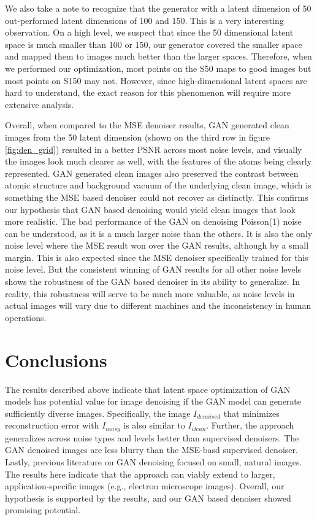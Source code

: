 \documentclass{article}
\begin{document}
We also take a note to recognize that the generator with a latent dimension of 50 out-performed latent dimensions of 100 and 150. This is a very interesting observation. On a high level, we suspect that since the 50 dimensional latent space is much smaller than 100 or 150, our generator covered the smaller space and mapped them to images much better than the larger spaces. Therefore, when we performed our optimization, most points on the S50 maps to good images but most points on S150 may not. However, since high-dimensional latent spaces are hard to understand, the exact reason for this phenomenon will require more extensive analysis.

Overall, when compared to the MSE denoiser results, GAN generated clean images from the 50 latent dimension (shown on the third row in figure \ref{fig:den_grid}) resulted in a better PSNR across most noise levels, and visually the images look much clearer as well, with the features of the atoms being clearly represented. GAN generated clean images also preserved the contrast between atomic structure and background vacuum of the underlying clean image, which is something the MSE based denoiser could not recover as distinctly. This confirms our hypothesis that GAN based denoising would yield clean images that look more realistic. The bad performance of the GAN on denoising Poisson(1) noise can be understood, as it is a much larger noise than the others. It is also the only noise level where the MSE result won over the GAN results, although by a small margin. This is also expected since the MSE denoiser specifically trained for this noise level. But the consistent winning of GAN results for all other noise levels shows the robustness of the GAN based denoiser in its ability to generalize. In reality, this robustness will serve to be much more valuable, as noise levels in actual images will vary due to different machines and the inconsistency in human operations.  
 

\section{Conclusions}
The results described above indicate that latent space optimization of GAN models has potential value for image denoising if the GAN model can generate sufficiently diverse images. Specifically, the image $I_{denoised}$ that minimizes reconstruction error with $I_{noisy}$ is also similar to $I_{clean}$. Further, the approach generalizes across noise types and levels better than supervised denoisers. The GAN denoised images are less blurry than the MSE-basd supervised denoiser. Lastly, previous literature on GAN denoising focused on small, natural images. The results here indicate that the approach can viably extend to larger, application-specific images (e.g., electron microscope images). Overall, our hypothesis is supported by the results, and our GAN based denoiser showed promising potential. 
\end{document}
